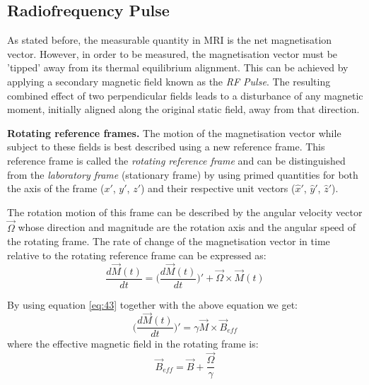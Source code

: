 \hfill

\subsection{Radiofrequency Pulse}\label{background:rfpulse}

As stated before, the measurable quantity in MRI is the net 
magnetisation vector. However, in order to be measured, 
the magnetisation vector must be 'tipped' away from its 
thermal equilibrium alignment.
This can be achieved by applying a secondary magnetic field known as the 
\textit{RF Pulse}.
The resulting combined effect of two perpendicular fields leads to a disturbance of any magnetic moment, initially aligned along the original static field, away from that direction. 

\hfill

\textbf{Rotating reference frames.} 
The motion of the magnetisation vector while subject to these fields is best described using a new reference frame.
This reference frame is called the \textit{rotating reference frame} and can be distinguished from the \textit{laboratory frame} (stationary frame) by using primed quantities for both the axis of the frame ($x'$, $y'$, $z'$) and their respective unit vectors ($\hat{x}'$, $\hat{y}'$, $\hat{z}'$). 

\hfill

The rotation motion of this frame can be described by the angular velocity vector $\vec{\Omega}$ whose direction and magnitude are the rotation axis and the angular speed of the rotating frame. The rate of change of the magnetisation vector in time relative to the rotating reference frame can be expressed as:
\begin{equation}\label{eq:4433}
    \frac{d \vec{M} (t)}{dt} = \Bigg( \frac{d \vec{M} (t)}{dt} \Bigg)' + \vec{\Omega} \times \vec{M}(t)
\end{equation}

By using equation \ref{eq:43} together with the above equation we get:
\begin{equation}\label{eq:313}
    \Bigg( \frac{d \vec{M} (t)}{dt} \Bigg)' = \gamma \vec{M} \times \vec{B}_{eff}
\end{equation}
where the effective magnetic field in the rotating frame is:
\begin{equation}\label{eq:314}
    \vec{B}_{eff} = \vec{B} + \frac{\vec{\Omega}}{\gamma}
\end{equation}

